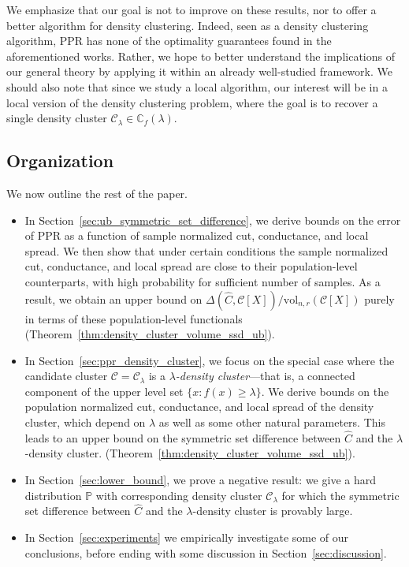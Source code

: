 \documentclass[11pt,twoside]{article}
\newcommand{\1}{\mathbf{1}}
\newcommand{\mc}[1]{\mathcal{#1}}
\newcommand{\Pbb}{\mathbb{P}}
\newcommand{\wh}[1]{\widehat{#1}}
\newcommand{\vol}{\mathrm{vol}}
\begin{document}
We emphasize that our goal is
not to improve on these results, nor to offer a better algorithm for density clustering. Indeed, seen as a density clustering algorithm, PPR has none 
of the optimality guarantees found in the aforementioned works. Rather, we hope to better understand the implications of our general theory by applying it within an already well-studied framework. We should also note that since we study a local algorithm, our interest will be in a local version of the density clustering problem, where the goal is to recover a single density cluster $\mc{C}_{\lambda} \in \mathbb{C}_f(\lambda)$. 

\subsection{Organization}
We now outline the rest of the paper.
\begin{itemize}
	\item In Section~\ref{sec:ub_symmetric_set_difference}, we derive bounds on the error of PPR as a function of sample normalized cut, conductance, and local spread. We then show that under certain conditions the sample normalized cut, conductance, and local spread are close to their population-level counterparts, with high probability for sufficient number of samples. As a result, we obtain an upper bound on $\Delta(\wh{C},\mc{C}[X])/\vol_{n,r}(\mc{C}[X])$ purely in terms of these population-level functionals (Theorem~\ref{thm:density_cluster_volume_ssd_ub}).
	\item In Section~\ref{sec:ppr_density_cluster}, we focus on the special case where the candidate cluster $\mc{C} = \mc{C}_{\lambda}$ is a \emph{$\lambda$-density cluster}---that is, a connected component of the upper level set $\{x: f(x) \geq \lambda\}$. We derive bounds on the population normalized cut, conductance, and local spread of the density cluster, which depend on $\lambda$ as well as some other natural parameters. This leads to an upper bound on the symmetric set difference between $\wh{C}$ and the $\lambda$-density cluster. (Theorem~\ref{thm:density_cluster_volume_ssd_ub}).
	\item In Section~\ref{sec:lower_bound}, we prove a negative result: we give a hard distribution $\Pbb$ with corresponding density cluster $\mc{C}_{\lambda}$ for which the symmetric set difference between $\wh{C}$ and the $\lambda$-density cluster is provably large.
	\item In Section~\ref{sec:experiments} we empirically investigate some of our conclusions, before ending with some discussion in Section~\ref{sec:discussion}.
\end{itemize}
\end{document}
